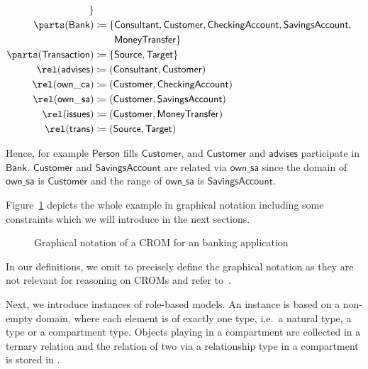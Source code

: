 \begin{example}
\begin{align*}
             \} \\
    \parts(\mathsf{Bank}) & \coloneqq \{\mathsf{Consultant}, \mathsf{Customer},
                             \mathsf{CheckingAccount}, \mathsf{SavingsAccount},\\
           & \phantom{{} \coloneqq \{} \mathsf{MoneyTransfer}\}\\
    \parts(\mathsf{Transaction}) & \coloneqq \{\mathsf{Source},  \mathsf{Target}\}\\
    \rel(\mathsf{advises}) & \coloneqq (\mathsf{Consultant}, \mathsf{Customer}) \\
    \rel(\mathsf{own\_ca}) & \coloneqq (\mathsf{Customer}, \mathsf{CheckingAccount}) \\
    \rel(\mathsf{own\_sa}) & \coloneqq (\mathsf{Customer}, \mathsf{SavingsAccount}) \\
    \rel(\mathsf{issues}) & \coloneqq (\mathsf{Customer}, \mathsf{MoneyTransfer}) \\
    \rel(\mathsf{trans}) & \coloneqq (\mathsf{Source}, \mathsf{Target})
  \end{align*}
   
  Hence, for example $\mathsf{Person}$ fills $\mathsf{Customer}$, and $\mathsf{Customer}$ and
  $\mathsf{advises}$ participate in $\mathsf{Bank}$. $\mathsf{Customer}$ and $\mathsf{SavingsAccount}$
  are related via $\mathsf{own\_sa}$ since the domain of $\mathsf{own\_sa}$ is $\mathsf{Customer}$
  and the range of $\mathsf{own\_sa}$ is $\mathsf{SavingsAccount}$.


  Figure~\ref{fig:bank} depicts the whole example in graphical notation including some constraints
  which we will introduce in the next sections.
\end{example}

\begin{figure}
  \centering
  \BankFullConstraintsExample
  \caption{Graphical notation of a CROM for an banking application}
  \label{fig:bank}
\end{figure}

In our definitions, we omit to precisely define the graphical notation as they are not relevant for
reasoning on CROMs and refer to~\cite{KBG-SLE15}.

Next, we introduce instances of role-based models. An instance is based on a non-empty domain,
where each element is of exactly one type, i.e.\ a natural type, a \rosirole type or a compartment
type. Objects playing \rosirole in a compartment are collected in a ternary relation \plays and the
relation of two \rosiroles via a relationship type in a compartment is stored in \links.


